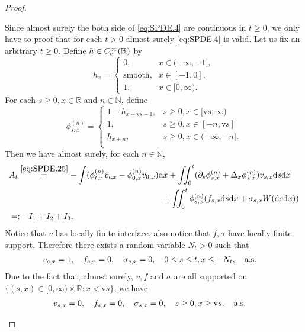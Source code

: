 \documentclass[12pt,a4paper]{amsart}
\numberwithin{equation}{section}
\theoremstyle{plain}
\theoremstyle{remark}
\newenvironment{proof*}[1][\proofname]{
	\renewcommand\qedsymbol{\rule{3mm}{3mm}}
	\begin{proof}[#1]}{\end{proof}}
\begin{document}
\begin{proof}
\begin{proof*}
	Since almost surely the both side of \eqref{eq:SPDE.4} are continuous in $t\geq 0$, we only have to proof that for each $t>0$ almost surely \eqref{eq:SPDE.4} is valid.
	Let us fix an arbitrary $t\geq 0$.
	Define $h\in C^\infty_{\rm c}(\mathbb R)$ by
\[
	h_{x}
	=  \begin{cases} 0, & x\in (-\infty, -1], \\ \text{smooth}, & x\in [-1,0],\\ 1, & x\in [0,\infty). \end{cases}	
\]
	For each $s\geq 0, x\in \mathbb R$ and $n\in \mathbb N$, define
\begin{equation} \label{eq:SPDE.5}
\phi^{(n)}_{s,x} 
= \begin{cases}
	1 - h_{x-\mathrm vs - 1}, & s\geq 0, x \in [\mathrm vs, \infty)\\
	1, & s\geq 0, x \in [-n, \mathrm vs] \\ 
	h_{x+n}, &s\geq 0, x \in (- \infty, -n]. \\
\end{cases}
\end{equation}
	Then we have almost surely, for each $n\in \mathbb N$,
	\begin{align} 
	& \begin{multlined}	
	A_t
	\overset{\eqref{eq:SPDE.25}}= -\int (\phi^{(n)}_{t,x} v_{t,x} - \phi^{(n)}_{0,x}v_{0,x}) \mathrm dx +\iint_0^t (\partial_s \phi^{(n)}_{s,x} +\Delta_x  \phi^{(n)}_{s,x})v_{s,x}\mathrm ds\mathrm dx 
	\\+ \iint_0^t \phi^{(n)}_{s,x}( f_{s,x}\mathrm ds\mathrm dx + \sigma_{s,x} W(\mathrm ds\mathrm dx))
	\end{multlined}
	\\ \label{eq:SPDE.54}&=: - I_1 + I_2 + I_3.
	\end{align}
	Notice that $v$ has locally finite interface, also notice that $f,\sigma$ have locally finite support. 
	Therefore there exists a random variable $N_t>0$ such that
\begin{align}  \label{eq:SPDE.55}
& v_{s,x} = 1,\quad  f_{s,x} = 0,\quad \sigma_{s,x} = 0, \quad 0\leq s\leq t, x\leq - N_t, \quad {\rm a.s.}
\end{align}
	Due to the fact that, almost surely, $v, f$ and $\sigma$ are all supported on $\{(s,x) \in [0,\infty)\times \mathbb R: x<\mathrm vs\}$, we have
\begin{align} \label{eq:SPDE.56}
&  v_{s,x} = 0,\quad  f_{s,x} = 0,\quad \sigma_{s,x} = 0, \quad s\geq 0, x\geq \mathrm vs, \quad {\rm a.s.}

\end{align}
\end{proof*}
\end{proof}
\end{document}
